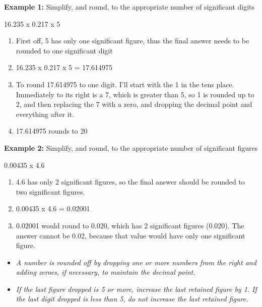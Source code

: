 \begin{itemize}
\begin{itemize}
\textbf{Example 1:}  Simplify, and round, to the appropriate number of significant digits \\
\begin{center}
16.235 x 0.217 x 5\\
\end{center}
\begin{enumerate}[Step 1.]
\item First off, 5 has only one significant figure, thus the final answer needs to be rounded to one significant digit\\
\item 16.235 x 0.217 x 5 = 17.614975\\
\item To round 17.614975 to one digit. I'll start with the 1 in the tens place. Immediately to its right is a 7, which is greater than 5, so 1 is rounded up to 2, and then replacing the 7 with a zero, and dropping the decimal point and everything after it.
\item 17.614975 rounds to 20\\
\end{enumerate}
\textbf{Example 2:}  Simplify, and round, to the appropriate number of significant figures\\
\begin{center}
0.00435 x 4.6
\end{center}
\begin{enumerate}[Step 1.]
\item 4.6 has only 2 significant figures, so the final answer should be rounded to two significant figures.
\item 0.00435 x 4.6 = 0.02001\\
\item 0.02001 would round to 0.020, which has 2 significant figures (0.020). The answer cannot be 0.02, because that value would have only one significant figure.\\
\end{enumerate}
\end{itemize}
\end{itemize}

\begin{itemize}
\item \emph{A number is rounded off by dropping one or more numbers from the right and adding zeroes, if necessary, to maintain the decimal point.} 
\item \emph{If the last figure dropped is 5 or more, increase the last retained figure by 1. If the last digit dropped is less than 5, do not increase the last retained figure.}
\end{itemize}
\newpage

